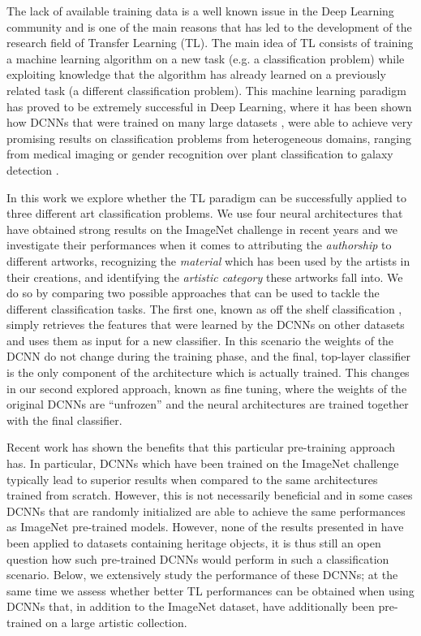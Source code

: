 \documentclass[runningheads]{llncs}
\begin{document}
The lack of available training data is a well known issue in the Deep Learning community and is one of the main reasons that has led to the development of the research field of Transfer Learning (TL). The main idea of TL consists of training a machine learning algorithm on a new task (e.g. a classification problem) while exploiting knowledge that the algorithm has already learned on a previously related task (a different classification problem). This machine learning paradigm has proved to be extremely successful in Deep Learning, where it has been shown how DCNNs that were trained on many large datasets \cite{huang2007labeled} \cite{stallkamp2011german}, were able to achieve very promising results on classification problems from heterogeneous domains, ranging from medical imaging \cite{tajbakhsh2016convolutional} or gender recognition \cite{van2015deep} over plant classification \cite{reyes2015fine} to galaxy detection \cite{ackermann2018using}.      

In this work we explore whether the TL paradigm can be successfully applied to three different art classification problems. We use four neural architectures that have obtained strong results on the ImageNet challenge in recent years and we investigate their performances when it comes to attributing the \textit{authorship} to different artworks, recognizing the \textit{material} which has been used by the artists in their creations, and identifying the \textit{artistic category} these artworks fall into. We do so by comparing two possible approaches that can be used to tackle the different classification tasks. The first one, known as off the shelf classification \cite{razavian2014cnn}, simply retrieves the features that were learned by the DCNNs on other datasets and uses them as input for a new classifier. In this scenario the weights of the DCNN do not change during the training phase, and the final, top-layer classifier is the only component of the architecture which is actually trained. This changes in our second explored approach, known as fine tuning, where the weights of the original DCNNs are ``unfrozen'' and the neural architectures are trained together with the final classifier. 

Recent work \cite{kornblith2018better} has shown the benefits that this particular pre-training approach has. In particular, DCNNs which have been trained on the ImageNet challenge typically lead to superior results when compared to the same architectures trained from scratch. However, this is not necessarily beneficial and in some cases DCNNs that are randomly initialized are able to achieve the same performances as ImageNet pre-trained models. However, none of the results presented in \cite{kornblith2018better} have been applied to datasets containing heritage objects, it is thus still an open question how such pre-trained DCNNs would perform in such a classification scenario. Below, we extensively study the performance of these DCNNs; at the same time we assess whether better TL performances can be obtained when using DCNNs that, in addition to the ImageNet dataset, have additionally been pre-trained on a large artistic collection.  
\end{document}
